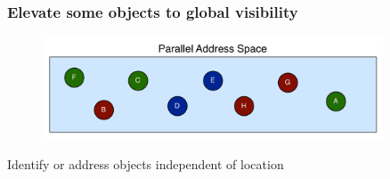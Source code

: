 \begin{frame}
  \frametitle{Elevate some objects to global visibility}
  \begin{figure}\includegraphics[width=0.9\textwidth]{../figures/objectGlobalAddress.pdf}\end{figure}
  \pause
  \begin{block}{}
  Identify or address objects independent of location
  \end{block}
\end{frame}


